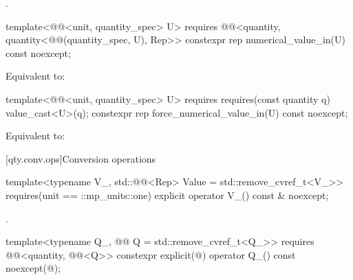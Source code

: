 \begin{itemdescr}
\pnum
\returns
{}.
\end{itemdescr}

\begin{itemdecl}
template<@@<unit, quantity_spec> U>
  requires @@<quantity, quantity<@@(quantity_spec, U{}), Rep>>
constexpr rep numerical_value_in(U) const noexcept;
\end{itemdecl}

\begin{itemdescr}
\pnum
\effects
Equivalent to:
\end{itemdescr}

\begin{itemdecl}
template<@@<unit, quantity_spec> U>
  requires requires(const quantity q) { value_cast<U{}>(q); }
constexpr rep force_numerical_value_in(U) const noexcept;
\end{itemdecl}

\begin{itemdescr}
\pnum
\effects
Equivalent to:
\end{itemdescr}

[qty.conv.ops]{Conversion operations}

\begin{itemdecl}
template<typename V_, std::@@<Rep> Value = std::remove_cvref_t<V_>>
  requires(unit == ::mp_units::one)
explicit operator V_() const & noexcept;
\end{itemdecl}

\begin{itemdescr}
\pnum
\returns
{}.
\end{itemdescr}

\begin{itemdecl}
template<typename Q_, @@ Q = std::remove_cvref_t<Q_>>
  requires @@<quantity, @@<Q>>
constexpr explicit(@\seebelownc@) operator Q_() const noexcept(@\seebelownc@);
\end{itemdecl}

